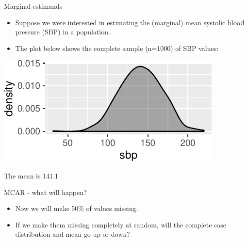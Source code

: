 \documentclass[ignorenonframetext,]{beamer}
\providecommand{\tightlist}{%
  \setlength{\itemsep}{0pt}\setlength{\parskip}{0pt}}
\begin{document}
\begin{frame}{Marginal estimands}
\protect\hypertarget{marginal-estimands}{}

\begin{itemize}
\tightlist
\item
  Suppose we were interested in estimating the (marginal) mean systolic
  blood pressure (SBP) in a population.
\item
  The plot below shows the complete sample (n=1000) of SBP values:
\end{itemize}

\begin{center}\includegraphics{Lecture2_files/figure-beamer/unnamed-chunk-2-1} \end{center}

The mean is 141.1

\end{frame}

\begin{frame}{MCAR - what will happen?}
\protect\hypertarget{mcar---what-will-happen}{}

\begin{itemize}
\tightlist
\item
  Now we will make 50\% of values missing.
\item
  If we make them missing completely at random, will the complete case
  distribution and mean go up or down?
\end{itemize}

\end{frame}
\end{document}
